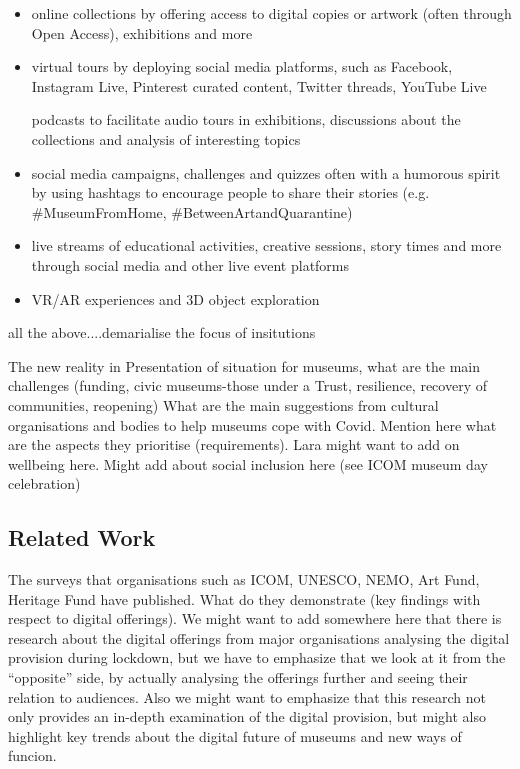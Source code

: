 \documentclass{egpubl}
\begin{document}
\begin{itemize}
\item online collections by offering access to digital copies or artwork (often through Open Access), exhibitions and more

\item virtual tours by deploying social media platforms, such as Facebook, Instagram Live, Pinterest curated content, Twitter threads, YouTube Live

\items podcasts to facilitate audio tours in exhibitions, discussions about the collections and analysis of interesting topics

\item social media campaigns, challenges and quizzes often with a humorous spirit by using hashtags to encourage people to share their stories (e.g. #MuseumFromHome, #BetweenArtandQuarantine)

\item live streams of educational activities, creative sessions, story times and more through social media and other live event platforms

\item VR/AR experiences and 3D object exploration

\end{itemize}







all the above....demarialise the focus of insitutions 




The new reality  in 
Presentation of situation for museums, what are the main challenges (funding, civic museums-those under a Trust, resilience, recovery of communities, reopening)
What are the main suggestions from cultural organisations and bodies to help museums cope with Covid. Mention here what are the aspects they prioritise (requirements).
Lara might want to add on wellbeing here.
Might add about social inclusion here (see ICOM museum day celebration)


\subsection{Related Work}
The surveys that organisations such as ICOM, UNESCO, NEMO, Art Fund, Heritage Fund have published. What do they demonstrate (key findings with respect to digital offerings).
We might want to add somewhere here that there is research about the digital offerings from major organisations analysing the digital provision during lockdown, but we have to emphasize that we look at it from the “opposite” side, by actually analysing the offerings further and seeing their relation to audiences. Also we might want to emphasize that this research not only provides an in-depth examination of the digital provision, but might also highlight key trends about the digital future of museums and new ways of funcion.
\end{document}
